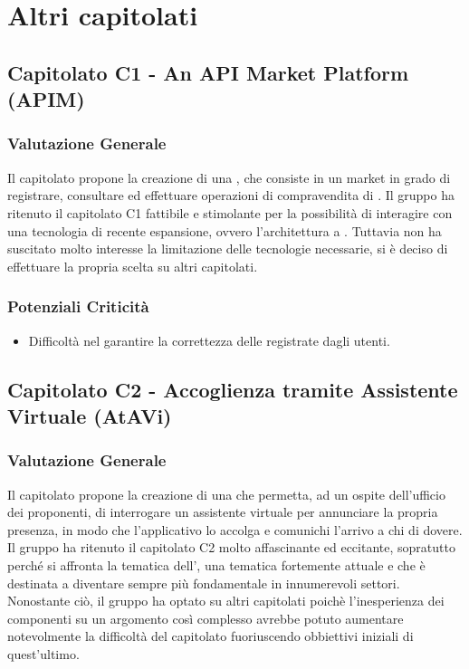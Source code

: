 \section{Altri capitolati}
  \subsection{Capitolato C1 - An API Market Platform (APIM)}
    \subsubsection{Valutazione Generale}
    Il capitolato propone la creazione di una , che consiste in un  market in grado di registrare, consultare ed effettuare operazioni di compravendita di .
    Il gruppo ha ritenuto il capitolato C1 fattibile e stimolante per la possibilità di interagire con una tecnologia di recente espansione, ovvero l'architettura a . Tuttavia non ha suscitato molto interesse la limitazione delle tecnologie necessarie, si è deciso di effettuare la propria scelta su altri capitolati.
    \subsubsection{Potenziali Criticità}
     \begin{itemize}
      \item Difficoltà nel garantire la correttezza delle  registrate dagli utenti.
     \end{itemize}
  \subsection{Capitolato C2 - Accoglienza tramite Assistente Virtuale (AtAVi)}
    \subsubsection{Valutazione Generale}
    Il capitolato propone la creazione di una  che permetta, ad un ospite dell'ufficio dei proponenti, di interrogare un assistente virtuale per annunciare la propria presenza, in modo che l'applicativo lo accolga e comunichi l'arrivo a chi di dovere.
    Il gruppo ha ritenuto il capitolato C2 molto affascinante ed eccitante, sopratutto perché si affronta la tematica dell', una tematica fortemente attuale e che è destinata a diventare sempre più fondamentale in innumerevoli settori. Nonostante ciò, il gruppo ha optato su altri capitolati poichè l'inesperienza dei componenti su un argomento così complesso avrebbe potuto aumentare notevolmente la difficoltà del capitolato fuoriuscendo obbiettivi iniziali di quest'ultimo.
